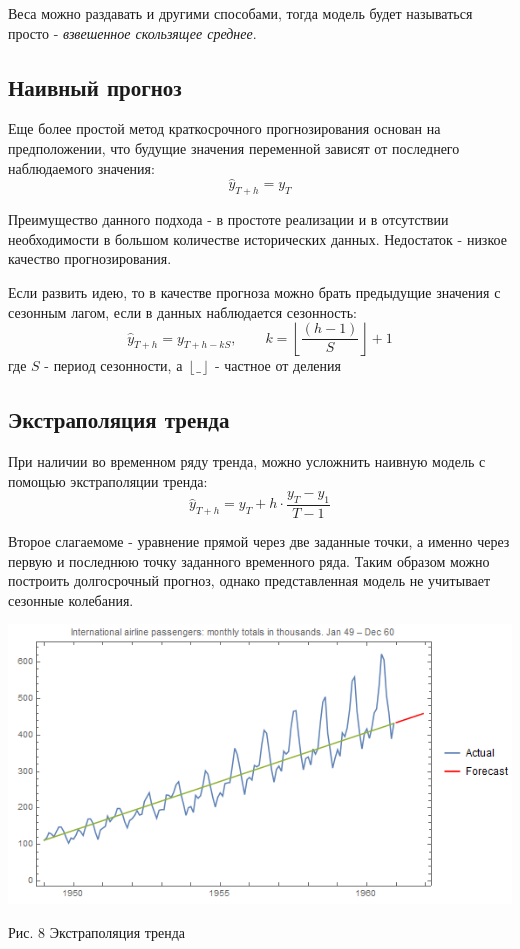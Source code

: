 \documentclass[aps,%
12pt,%
final,%
oneside,
onecolumn,%
musixtex, %
superscriptaddress,%
centertags]{article} %
\theoremstyle{plain}
\theoremstyle{definition}
\theoremstyle{remark}
\begin{document}
Веса можно раздавать и другими способами, тогда модель будет называться просто - \textit{взвешенное скользящее среднее}.


\newpage
\subsection{Наивный прогноз}

Еще более простой метод краткосрочного прогнозирования основан на предположении, что будущие значения переменной зависят от последнего наблюдаемого значения:
$$\hat{y}_{T+h} = y_T$$

Преимущество данного подхода - в простоте реализации и в отсутствии необходимости в большом количестве исторических данных. Недостаток - низкое качество прогнозирования.

Если развить идею, то в качестве прогноза можно брать предыдущие значения с сезонным лагом, если в данных наблюдается сезонность:
$$\hat{y}_{T+h} = y_{T+h-kS}, \qquad k = \left \lfloor \frac{(h-1)}{S} \right\rfloor + 1$$
где $S$ - период сезонности, а $\left \lfloor \_ \right \rfloor$ - частное от деления

\newpage
\subsection{Экстраполяция тренда}

При наличии во временном ряду тренда, можно усложнить наивную модель с помощью экстраполяции тренда:
$$\hat{y}_{T+h} = y_T + h \cdot \frac{y_T-y_1}{T-1}$$

Второе слагаемоме - уравнение прямой через две заданные точки, а именно через первую и последнюю точку заданного временного ряда. Таким образом можно построить долгосрочный прогноз, однако представленная модель не учитывает сезонные колебания.

\begin{center}
	\includegraphics[scale=0.5]{images/8.png}

	Рис. 8 Экстраполяция тренда
\end{center}
\end{document}
